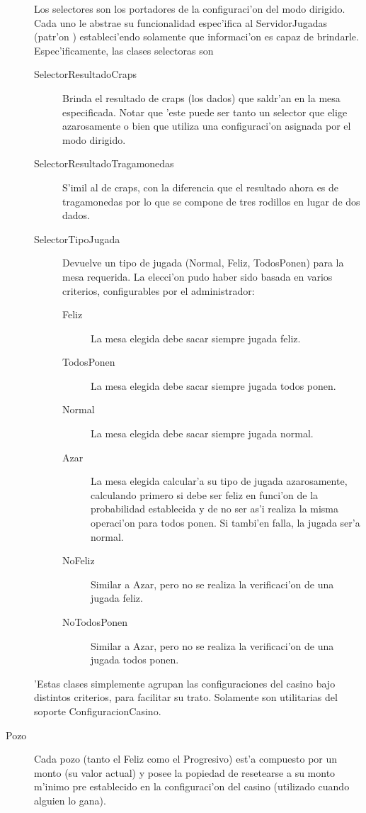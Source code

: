 \begin{description}
\item[] Los selectores son los portadores de la configuraci'on del modo dirigido. Cada uno le abstrae su funcionalidad espec'ifica al ServidorJugadas (patr'on ) estableci'endo solamente que informaci'on es capaz de brindarle. Espec'ificamente, las clases selectoras son
	\begin{description}
	\item[SelectorResultadoCraps] Brinda el resultado de craps (los dados) que saldr'an en la mesa especificada. Notar que 'este puede ser tanto un selector que elige azarosamente o bien que utiliza una configuraci'on asignada por el modo dirigido.
	\item[SelectorResultadoTragamonedas] S'imil al de craps, con la diferencia que el resultado ahora es de tragamonedas por lo que se compone de tres rodillos en lugar de dos dados.
	\item[SelectorTipoJugada] Devuelve un tipo de jugada (Normal, Feliz, TodosPonen) para la mesa requerida. La elecci'on pudo haber sido basada en varios criterios, configurables por el administrador:
		\begin{description}
			\item[Feliz] La mesa elegida debe sacar siempre jugada feliz.
			\item[TodosPonen] La mesa elegida debe sacar siempre jugada todos ponen.
			\item[Normal] La mesa elegida debe sacar siempre jugada normal.
			\item[Azar] La mesa elegida calcular'a su tipo de jugada azarosamente, calculando primero si debe ser feliz en funci'on de la probabilidad establecida y de no ser as'i realiza la misma operaci'on para todos ponen. Si tambi'en falla, la jugada ser'a normal.
			\item[NoFeliz] Similar a Azar, pero no se realiza la verificaci'on de una jugada feliz.
			\item[NoTodosPonen] Similar a Azar, pero no se realiza la verificaci'on de una jugada todos ponen. 
		\end{description} 
	\end{description}

\item[] 'Estas clases simplemente agrupan las configuraciones del casino bajo distintos criterios, para facilitar su trato. Solamente son utilitarias del soporte ConfiguracionCasino. 

\item[Pozo] Cada pozo (tanto el Feliz como el Progresivo) est'a compuesto por un monto (su valor actual) y posee la popiedad de resetearse a su monto m'inimo pre establecido en la configuraci'on del casino (utilizado cuando alguien lo gana). 

\end{description}
